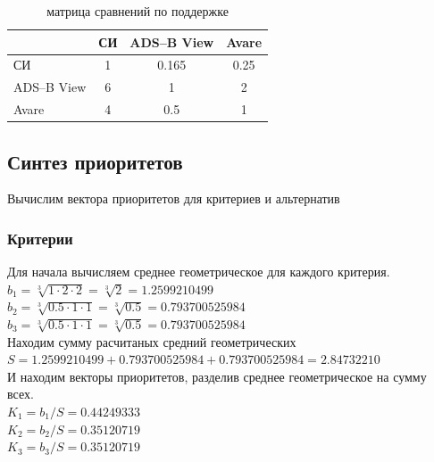 \documentclass[a4paper,12pt]{report} %
\begin{document}
\begin{table}
  \caption{матрица сравнений по поддержке}
  \begin{tabular}{l|c|c|c|}
    \cline{2-4}
    {}                               & \multicolumn{1}{l|}{СИ}        & \multicolumn{1}{l|}{ADS--B View} & \multicolumn{1}{l|}{Avare} \\ \hline
    \multicolumn{1}{|l|}{СИ}         & 1                              & 0.165                           & 0.25                       \\ \hline
    \multicolumn{1}{|l|}{ADS--B View} & 6                              & 1                               & 2                          \\ \hline
    \multicolumn{1}{|l|}{Avare}      & 4                              & 0.5                             & 1                          \\ \hline
  \end{tabular}
\end{table}

\subsection{Синтез приоритетов}

Вычислим вектора приоритетов для критериев и альтернатив

\subsubsection{Критерии}

Для начала вычисляем среднее геометрическое для каждого критерия.
$ b_1=\sqrt[3]{1 \cdot 2 \cdot 2} = \sqrt[3]{2} = 1.2599210499 $ \\
$ b_2=\sqrt[3]{0.5 \cdot 1 \cdot 1} = \sqrt[3]{0.5} = 0.793700525984 $ \\
$ b_3=\sqrt[3]{0.5 \cdot 1 \cdot 1} = \sqrt[3]{0.5} = 0.793700525984 $ \\

Находим сумму расчитаных средний геометрических
\\
$ S = 1.2599210499 + 0.793700525984 + 0.793700525984 = 2.84732210 $ \\

И находим векторы приоритетов, разделив среднее геометрическое на сумму всех.
\\
$K_1 = b_1/S = 0.44249333 $ \\
$K_2 = b_2/S = 0.35120719 $ \\
$K_3 = b_3/S = 0.35120719 $ \\
\end{document}
